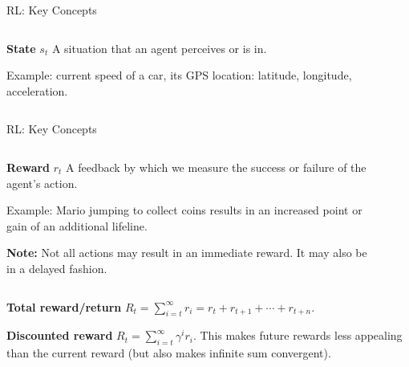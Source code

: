\documentclass[aspectratio=169,xcolor=dvipsnames,svgnames,x11names,fleqn]{beamer}
\begin{document}
\begin{frame}{RL: Key Concepts}

\begin{columns}[c] %

    
    \begin{tblock}{\textbf{State} $s_t$}
A situation that an agent perceives or is in. 

Example: current speed of a car, its GPS location: latitude, longitude, acceleration.
    \end{tblock}

    {\Huge \faChartLine~~\faLocationArrow}

\end{columns}

\end{frame}
\begin{frame}{RL: Key Concepts}

\begin{columns}[c] %

    
    \begin{tblock}{\textbf{Reward} $r_t$}
A feedback by which we measure the success or failure of the agent's action.

Example: Mario jumping to collect coins results in an increased point or gain of an additional lifeline.

\textbf{Note:} Not all actions may result in an immediate reward. It may also be in a delayed fashion.
    \end{tblock}

    {\huge \faMoneyBill~~\faBitcoin~~\faDollarSign}

\end{columns}
\vspace{10pt}
\textbf{ Total reward/return} $R_t = \sum_{i=t}^\infty r_i = r_t+ r_{t+1} + \cdots + r_{t+n}$.

\vspace{10pt}
\textbf{ Discounted reward} $R_t = \sum_{i=t}^\infty \gamma^i r_i $. This makes future rewards less appealing than the current reward (but also makes infinite sum convergent).

\end{frame}
\end{document}

